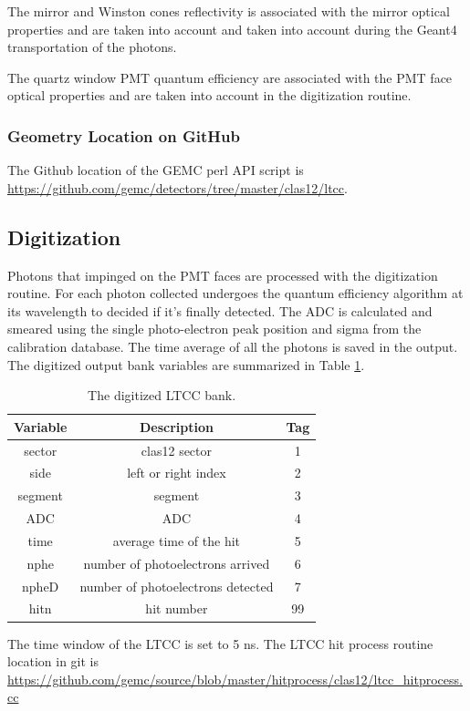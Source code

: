 The mirror and Winston cones reflectivity is associated with the mirror optical properties and are taken into
account and taken into account during the Geant4 transportation of the photons.

The quartz window PMT quantum efficiency are associated with the PMT face optical properties and are taken into account in
the digitization routine.

\subsubsection{Geometry Location on GitHub}
The Github location of the GEMC perl API script is  \url{https://github.com/gemc/detectors/tree/master/clas12/ltcc}.


\subsection{Digitization}

Photons that impinged on the PMT faces are processed with the digitization routine.
For each photon collected undergoes the quantum efficiency algorithm at its wavelength to decided if it's finally detected.
The ADC is calculated and smeared using the single photo-electron peak position and sigma from the calibration database.
The time average of all the photons is saved in the output.
The digitized output bank variables are summarized in Table \ref{tab:ltccBank}.

\begin{table}[h]
	\begin{center}
		\begin{tabular}{| c | c | c |}
			\hline \hline
			Variable    & Description                                        & Tag  \\
			\hline
             sector  &                                     clas12 sector  &    1 \\
               side  &                               left or right index  &    2 \\
            segment  &                                           segment  &    3 \\
                ADC  &                                               ADC  &    4 \\
               time  &                           average time of the hit  &    5 \\
               nphe  &                  number of photoelectrons arrived  &    6 \\
              npheD  &                 number of photoelectrons detected  &    7 \\
               hitn  &                                        hit number  &   99 \\
			\hline \hline
		\end{tabular}
	\end{center}
	\caption{The digitized LTCC bank.}\label{tab:ltccBank}
\end{table}

The time window  of the LTCC is set to 5 ns.
The LTCC hit process routine location in git is \url{https://github.com/gemc/source/blob/master/hitprocess/clas12/ltcc_hitprocess.cc}
